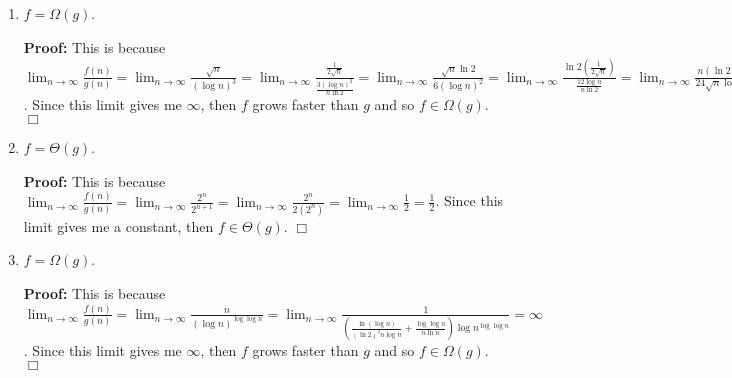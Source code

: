 \documentclass[11pt]{article}
\def\endproofmark{$\Box$}
\newenvironment{proof}{\par{\bf Proof:}}{\endproofmark\smallskip}
\begin{document}
\begin{enumerate}[label=(\alph*)]
\begin{enumerate}[label=(\roman*)]
\item
$f = \Omega(g)$.
\begin{proof}
This is because $\displaystyle{\lim_{n \to \infty} \frac{f(n)} {g(n)}} = \displaystyle{\lim_{n \to \infty} \frac{\sqrt{n}} {(\log{n})^3}} = \displaystyle{\lim_{n \to \infty} \frac{\frac{1} {2\sqrt{n}}} {\frac{3(\log{n})^2} {n\ln{2}}}} = \displaystyle{\lim_{n \to \infty} \frac{\sqrt{n}\ln{2}} {6(\log{n})^2}} = \displaystyle{\lim_{n \to \infty} \frac{\ln{2}(\frac{1} {2\sqrt{n}})} {\frac{12\log{n}} {n\ln{2}}}} = \displaystyle{\lim_{n \to \infty} \frac{n(\ln{2})^2} {24\sqrt{n}\log{n}}} = \displaystyle{\lim_{n \to \infty} \frac{(\ln{2})^2\sqrt{n}} {24\log{n}}} = \displaystyle{\lim_{n \to \infty} \frac{\frac{(\ln{2})^2} {2\sqrt{n}}} {\frac{24} {n\ln{2}}}} = \displaystyle{\lim_{n \to \infty} \frac{(\ln{2})^3n} {48\sqrt{n}}} = \displaystyle{\lim_{n \to \infty} \frac{(\ln{2})^3\sqrt{n}} {48}} = \infty$. Since this limit gives me $\infty$, then $f$ grows faster than $g$ and so $f \in \Omega(g)$.
\end{proof}

\item
$f = \Theta(g)$.
\begin{proof}
This is because $\displaystyle{\lim_{n \to \infty} \frac{f(n)} {g(n)}} = \displaystyle{\lim_{n \to \infty} \frac{2^n} {2^{n + 1}}} = \displaystyle{\lim_{n \to \infty} \frac{2^n} {2(2^n)}} = \displaystyle{\lim_{n \to \infty} \frac{1} {2}} = \frac{1} {2}$. Since this limit gives me a constant, then $f \in \Theta(g)$.
\end{proof}

\item
$f = \Omega(g)$.
\begin{proof}
This is because $\displaystyle{\lim_{n \to \infty} \frac{f(n)} {g(n)}} = \displaystyle{\lim_{n \to \infty} \frac{n} {(\log{n})^{\log{\log{n}}}}} = \displaystyle{\lim_{n \to \infty} \frac{1} {(\frac{\ln{(\log{n})}} {(\ln{2})^2n\log{n}} + \frac{\log{\log{n}}} {n\ln{n}})\log{n}^{\log{\log{n}}}}} = \infty$. Since this limit gives me $\infty$, then $f$ grows faster than $g$ and so $f \in \Omega(g)$.
\end{proof}


\end{enumerate}
\end{enumerate}
\end{document}
